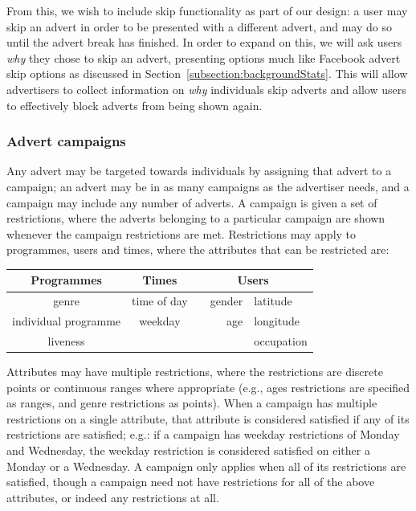 	From this, we wish to include skip functionality as part of our design: a user may skip an advert in order to be presented with a different advert, and may do so until the advert break has finished. In order to expand on this, we will ask users \textit{why} they chose to skip an advert, presenting options much like Facebook advert skip options as discussed in Section~\ref{subsection:backgroundStats}. This will allow advertisers to collect information on \textit{why} individuals skip adverts and allow users to effectively block adverts from being shown again. 

	\subsubsection{Advert campaigns}

	Any advert may be targeted towards individuals by assigning that advert to a campaign; an advert may be in as many campaigns as the advertiser needs, and a campaign may include any number of adverts. A campaign is given a set of restrictions, where the adverts belonging to a particular campaign are shown whenever the campaign restrictions are met. Restrictions may apply to programmes, users and times, where the attributes that can be restricted are:

	\begin{center}
		\begin{tabular}{c c r l}
			\toprule
			\textbf{Programmes} & \textbf{Times} & \multicolumn{2}{c}{\textbf{Users}} \\
			\midrule
			genre & time of day & ~~gender & latitude \\ %
			individual programme & weekday & age & longitude \\
			liveness & & &  occupation \\
			\bottomrule
		\end{tabular}
	\end{center}

	Attributes may have multiple restrictions, where the restrictions are discrete points or continuous ranges where appropriate (e.g., ages restrictions are specified as ranges, and genre restrictions as points). When a campaign has multiple restrictions on a single attribute, that attribute is considered satisfied if any of its restrictions are satisfied; e.g.: if a campaign has weekday restrictions of Monday and Wednesday, the weekday restriction is considered satisfied on either a Monday or a Wednesday. A campaign only applies when all of its restrictions are satisfied, though a campaign need not have restrictions for all of the above attributes, or indeed any restrictions at all.

